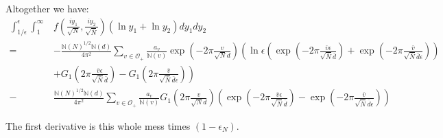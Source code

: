 \documentclass{article}
\theoremstyle{plain}
\begin{document}
Altogether we have:
\begin{align*}
\int_{1/\epsilon}^{\epsilon} \int_{1}^{\infty} & f\left(\frac{iy_1}{\sqrt{N}},\frac{iy_2}{\sqrt{\bar{N}}}\right) (\ln y_1+\ln y_2)dy_1 dy_2 \\
= &- \frac{\mathbb{N}(N)^{1/2}\mathbb{N}(d)}{4 \pi^2 }\sum_{v \in \mathcal{O}_+}  \frac{a_v}{\mathbb{N}(v)}  \exp\left( -2\pi \frac{v}{\sqrt{N} d}\right) \left( \ln \epsilon \left( \exp \left( -2\pi \frac{\bar{v} \epsilon}{\sqrt{\bar{N}}\bar{d}}\right) +  \exp \left( -2\pi \frac{\bar{v} }{\sqrt{\bar{N}}\bar{d}\epsilon}\right) \right) \right. \\
& + \left. G_1\left(2\pi \frac{\bar{v} \epsilon}{\sqrt{\bar{N}}\bar{d}}\right)-G_1\left( 2\pi \frac{\bar{v} }{\sqrt{\bar{N}}\bar{d}\epsilon}\right) \right) \\
- & \frac{\mathbb{N}(N)^{1/2}\mathbb{N}(d)}{4 \pi^2 } \sum_{v \in \mathcal{O}_+} \frac{a_v}{\mathbb{N}(v)}  G_1\left( 2\pi \frac{v}{\sqrt{N} d}\right) \left( \exp \left( -2\pi \frac{\bar{v} \epsilon}{\sqrt{\bar{N}}\bar{d}}\right) -  \exp \left( -2\pi \frac{\bar{v} }{\sqrt{\bar{N}}\bar{d}\epsilon}\right)\right)
\end{align*}

The first derivative is this whole mess times $(1 - \epsilon_N)$.
\end{document}
